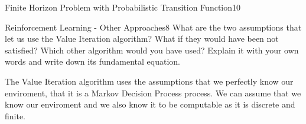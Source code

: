 \begin{questions}
\begin{question}{Finite Horizon Problem with Probabilistic Transition Function}{10}
\begin{answer}\end{answer}

\end{question}



\begin{question}[bonus]{Reinforcement Learning - Other Approaches}{8}
What are the two assumptions that let us use the Value Iteration algorithm? What if they would have been not satisfied? Which other algorithm would you have used? Explain it with your own words and write down its fundamental equation.

\begin{answer}
	The Value Iteration algorithm uses the assumptions that we perfectly know our enviroment, that it is a Markov Decision Process process. We can assume that we know our enviroment and we also know it to be computable as it is discrete and finite.
\end{answer}
\end{question}


\end{questions}
